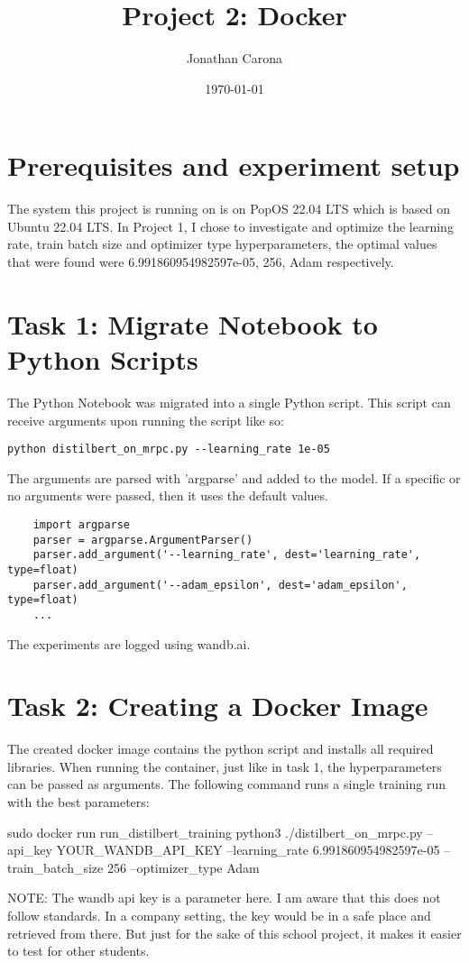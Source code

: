\documentclass{article}
\title{Project 2: Docker}
\author{Jonathan Carona}
\date{\today}
\begin{document}
\section{Prerequisites and experiment setup}
The system this project is running on is on PopOS 22.04 LTS which is
based on Ubuntu 22.04 LTS. In Project 1, I chose to investigate and optimize the learning rate,
train batch size and optimizer type hyperparameters, the optimal values that were found were
6.991860954982597e-05, 256, Adam respectively.

\section{Task 1: Migrate Notebook to Python Scripts}
The Python Notebook was migrated into a single Python script. This script can receive arguments upon running the script like so:

\verb!python distilbert_on_mrpc.py --learning_rate 1e-05!

The arguments are parsed with 'argparse' and added to the model. If a specific or no arguments were passed, then it uses the default values.
\begin{lstlisting}
    import argparse
    parser = argparse.ArgumentParser()
    parser.add_argument('--learning_rate', dest='learning_rate', type=float)
    parser.add_argument('--adam_epsilon', dest='adam_epsilon', type=float)
    ...
    \end{lstlisting}

The experiments are logged using wandb.ai.

\section{Task 2: Creating a Docker Image}
The created docker image contains the python script and installs all required libraries.
When running the container, just like in task 1, the hyperparameters can be passed as arguments. 
The following command runs a single training run with the best parameters:

\begin{spverbatim}
    sudo docker run run_distilbert_training python3 ./distilbert_on_mrpc.py --api_key YOUR_WANDB_API_KEY --learning_rate 6.991860954982597e-05 --train_batch_size 256 --optimizer_type Adam    
    \end{spverbatim}

NOTE: The wandb api key is a parameter here. I am aware that this does not follow standards. In a company setting, the key would be in a safe place and retrieved from there. But just for the sake of this school project, it makes it easier to test for other students.
\end{document}
